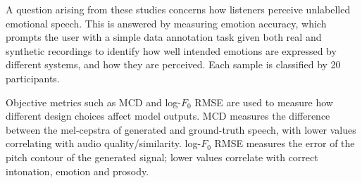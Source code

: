 A question arising from these studies concerns how listeners perceive unlabelled emotional speech. This is answered by measuring emotion accuracy, which prompts the user with a simple data annotation task given both real and synthetic recordings to identify how well intended emotions are expressed by different systems, and how they are perceived. Each sample is classified by 20 participants.

Objective metrics such as \ac{MCD} and log-$F_0$ \ac{RMSE} are used to measure how different design choices affect model outputs. \ac{MCD} measures the difference between the mel-cepstra of generated and ground-truth speech, with lower values correlating with audio quality/similarity. log-$F_0$ \ac{RMSE} measures the error of the pitch contour of the generated signal; lower values correlate with correct intonation, emotion and prosody.


